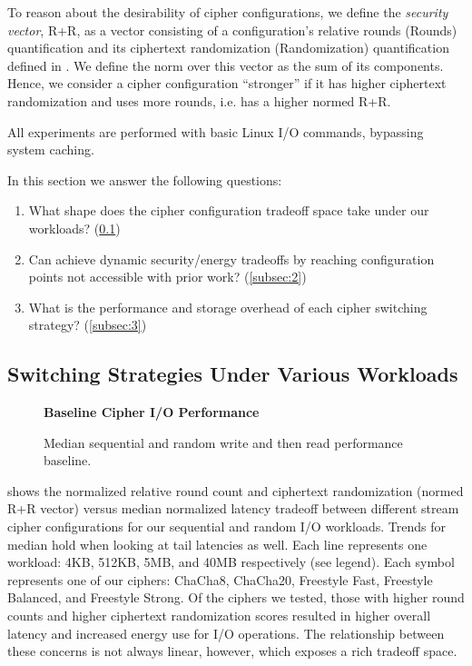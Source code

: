 To reason about the desirability of cipher configurations, we define the
\emph{security vector}, R+R, as a vector consisting of a configuration's
relative rounds (Rounds) quantification and its ciphertext randomization
(Randomization) quantification defined in . We define the norm
over this vector as the sum of its components. Hence, we consider a cipher
configuration ``stronger'' if it has higher ciphertext randomization and uses
more rounds, i.e. has a higher normed R+R.

All experiments are performed with basic Linux I/O commands, bypassing system
caching.

In this section we answer the following questions:

\begin{enumerate}
  \item What shape does the cipher configuration tradeoff space take under our
  workloads? (\cref{subsec:1})
  \item Can \sys achieve dynamic security/energy tradeoffs by reaching
  configuration points not accessible with prior work? (\cref{subsec:2})
  \item What is the performance and storage overhead of each cipher switching
  strategy? (\cref{subsec:3})
\end{enumerate}


\subsection{Switching Strategies Under Various Workloads}\label{subsec:1}

\begin{figure}[ht]
  \textbf{Baseline Cipher I/O Performance}\par\medskip
  {}
  \caption{Median sequential and random write and then read performance baseline.}
  \label{fig:tradeoff-no-ratios}
\end{figure}

 shows the normalized relative round count and
ciphertext randomization (normed R+R vector) versus median normalized latency
tradeoff between different stream cipher configurations for our sequential and
random I/O workloads. Trends for median hold when looking at tail latencies as
well. Each line represents one workload: 4KB, 512KB, 5MB, and 40MB respectively
(see legend). Each symbol represents one of our ciphers: ChaCha8, ChaCha20,
Freestyle Fast, Freestyle Balanced, and Freestyle Strong. Of the ciphers we
tested, those with higher round counts and higher ciphertext randomization
scores resulted in higher overall latency and increased energy use for I/O
operations. The relationship between these concerns is not always linear,
however, which exposes a rich tradeoff space.


